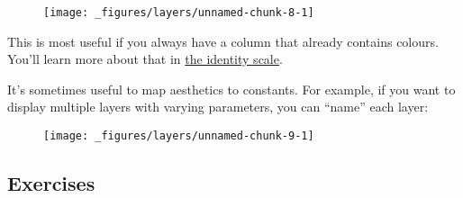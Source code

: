\begin{figure}[H]
  \centering
  \texttt{[image: \_figures/layers/unnamed-chunk-8-1]}
\end{figure}

This is most useful if you always have a column that already contains
colours. You'll learn more about that in
\hyperref[sub:scale-identity]{the identity scale}.

It's sometimes useful to map aesthetics to constants. For example, if
you want to display multiple layers with varying parameters, you can
``name'' each layer:

\begin{Shaded}
\begin{Highlighting}[]
\StringTok{ }
\StringTok{  }\NormalTok{() +}
\StringTok{  }\NormalTok{(}\NormalTok{(} \NormalTok{), } \NormalTok{, } \NormalTok{) +}\StringTok{ }
\StringTok{  }\NormalTok{(}\NormalTok{(} \NormalTok{), } \NormalTok{, } \NormalTok{) +}
\StringTok{  }\NormalTok{(} \NormalTok{)}
\end{Highlighting}
\end{Shaded}

\begin{figure}[H]
  \centering
  \texttt{[image: \_figures/layers/unnamed-chunk-9-1]}
\end{figure}

\subsection{Exercises}

